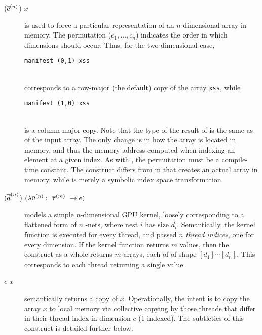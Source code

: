 \begin{description}
\item[ ($\nseq{c}{n}$) $x$] is used to force a particular
  representation of an $n$-dimensional array in memory.  The
  permutation ($c_{1}, \ldots, c_{n}$) indicates the order in
  which dimensions should occur.  Thus, for the two-dimensional case,\\
  \centerline{\mbox{\lstinline{manifest (0,1) xss}}}\\
  corresponds to a row-major
  (the default) copy of the array \lstinline{xss}, while\\
  \centerline{\mbox{\lstinline{manifest (1,0) xss}}}\\
  is a column-major copy.  Note that the type of the result of
   is the same as of the input array.  The only change is
  in how the array is located in memory, and thus the memory address
  computed when indexing an element at a given index.  As with
  , the permutation must be a compile-time constant.
  The  construct differs from  in that
   creates an actual array in memory, while
   is merely a symbolic index space transformation.
\item[ ($\nseq{d}{n}$)
  $(\Fn{\nseq{\tau}{m}}{\nseq{v}{n}}{e})$] models a simple
  $n$-dimensional GPU kernel, loosely corresponding to a flattened
  form of $n$ -nets, where nest $i$ has size $d_{i}$.
  Semantically, the kernel function is executed for every thread, and
  passed $n$ \textit{thread indices}, one for every dimension.  If the
  kernel function returns $m$ values, then the  construct
  as a whole returns $m$ arrays, each of of shape
  $[d_{1}]\cdots[d_{n}]$.  This corresponds to each thread returning a
  single value.
\item[ $c$ $x$] semantically returns a copy of $x$.
  Operationally, the intent is to copy the array $x$ to local memory
  via collective copying by those threads that differ in their thread
  index in dimension $c$ (1-indexed).  The subtleties of this
  construct is detailed further below.
\end{description}

